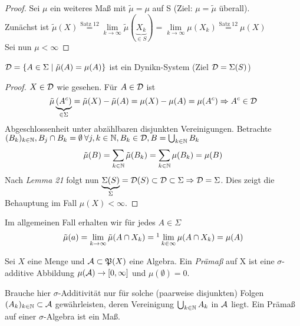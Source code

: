 \documentclass[skript.tex]{subfiles}
\begin{document}
	\begin{proof}
		Sei $\mu$ ein weiteres Maß mit $\tilde{\mu}=\mu$ auf S (Ziel: $\mu=\tilde{\mu}$ überall).\\
		Zunächst ist $\tilde{\mu}(X)\stackrel{\textrm{Satz 12}}=\lim\limits_{k \to \infty}\tilde{\mu}(\underbrace{X_k}_{\in S})=\lim\limits_{k \to \infty}\mu(X_k)\stackrel{\textrm{Satz 12}}=\mu(X)$ \\
		Sei nun $\mu<\infty$
	\end{proof}

	\begin{beh*}
		$\mathcal{D}=\{A\in \Sigma \mid \tilde{\mu}(A)=\mu(A)\}$ ist ein Dynikn-System (Ziel $\mathcal{D}=\Sigma(S)$)
	\end{beh*}

	\begin{proof}
		$X\in\mathcal{D}$ wie gesehen. Für $A\in\mathcal{D}$ ist
		\begin{equation*}
			\tilde{\mu}\underbrace{(A^c)}_{\in\Sigma}=\tilde{\mu}(X)-\tilde{\mu}(A)=\mu(X)-\mu(A)=\mu(A^c) \Rightarrow A^c\in\mathcal{D}
		\end{equation*}
	Abgeschlossenheit unter abzählbaren disjunkten Vereinigungen.
	Betrachte $(B_k)_{k\in\mathbb{N}},\\ B_j\cap B_k=\emptyset \: \forall j,k \in \mathbb{N}, B_k \in \mathcal{D}, B=\bigcup_{k \in\mathbb{N}} B_k$
	\begin{equation*}
		\tilde{\mu}(B)= \sum_{k\in \mathbb{N}}\tilde{\mu}(B_k)=\sum_{k\in \mathbb{N}}\mu(B_k)=\mu(B)
	\end{equation*}
	Nach \textit{Lemma 21} folgt nun $\underbrace{\Sigma(S)}_{\Sigma}=\mathcal{D}(S) \subset \mathcal{D} \subset \Sigma \Rightarrow \mathcal{D}=\Sigma$. Dies zeigt die Behauptung im Fall $\mu(X)<\infty$.
	\end{proof}

	Im allgemeinen Fall erhalten wir für jedes $A\in\Sigma$
	\begin{equation*}
		\tilde{\mu}(a)=\lim\limits_{k \to \infty}\tilde{\mu}(A \cap X_k)=\footnotemark \lim\limits_{k\in\infty}\mu(A\cap X_k)=\mu(A)
	\end{equation*}

	\begin{defin}[Prämaß]
		Sei $X$ eine Menge und $\mathcal{A} \subset \mathfrak{P}(X)$ eine Algebra. Ein \textit{Prämaß} auf X ist eine $\sigma$-additive Abbildung $\mu(\mathcal{A}) \to [0,\infty]$ und $ \mu(\emptyset)=0$.
	\end{defin}

	\begin{bem*}
		Brauche hier $\sigma$-Additivität nur für solche (paarweise disjunkten) Folgen \\$(A_k)_{k\in\mathbb{N}} \subset \mathcal{A}$ gewährleisten, deren Vereinigung $\bigcup_{k\in\mathbb{N}}A_k$ in $\mathcal{A}$ liegt. Ein Prämaß auf einer $\sigma$-Algebra ist ein Maß.
	\end{bem*}
\end{document}
